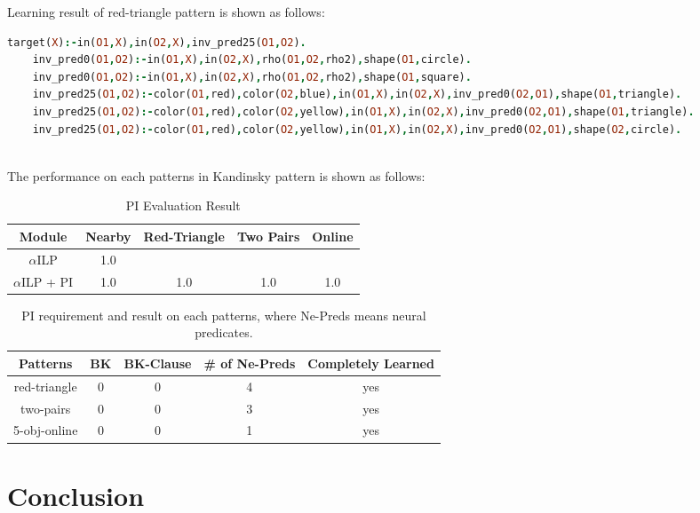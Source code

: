 \documentclass[
]{ceurart}
\begin{document}
Learning result of red-triangle pattern is shown as follows:

\begin{lstlisting}[language=Prolog, mathescape]
	target(X):-in(O1,X),in(O2,X),inv_pred25(O1,O2).
	inv_pred0(O1,O2):-in(O1,X),in(O2,X),rho(O1,O2,rho2),shape(O1,circle).
	inv_pred0(O1,O2):-in(O1,X),in(O2,X),rho(O1,O2,rho2),shape(O1,square).
	inv_pred25(O1,O2):-color(O1,red),color(O2,blue),in(O1,X),in(O2,X),inv_pred0(O2,O1),shape(O1,triangle).
	inv_pred25(O1,O2):-color(O1,red),color(O2,yellow),in(O1,X),in(O2,X),inv_pred0(O2,O1),shape(O1,triangle).
	inv_pred25(O1,O2):-color(O1,red),color(O2,yellow),in(O1,X),in(O2,X),inv_pred0(O2,O1),shape(O2,circle).
\end{lstlisting}\\



The performance on each patterns in Kandinsky pattern is shown as follows:
\begin{table}
	\caption{PI Evaluation Result}
	\label{tab:nearby-pi-result}
	\begin{tabular}{ccccc}
		\toprule
		Module              & Nearby & Red-Triangle & Two Pairs & Online\\
		\midrule
		$\alpha$ILP 	    & 1.0 	    & 		    & 		    &           \\
		$\alpha$ILP + PI    & 	1.0 	& 1.0	& 1.0	    &  1.0    \\
		\bottomrule
	\end{tabular}
\end{table}



\begin{table}
	\caption{PI requirement and result on each patterns, where Ne-Preds means neural predicates.}
	\label{tab:pi-result}
	\begin{tabular}{ccccc}
		\toprule
		Patterns             & BK & BK-Clause & \# of Ne-Preds & Completely Learned\\
		\midrule
		red-triangle 	    & 0 	    & 	0	    &  4   &   yes        \\
		two-pairs    & 	0 	& 0	& 3	    &  yes    \\
		5-obj-online    & 	0 	& 0	&  	 1   &   yes   \\
		\bottomrule
	\end{tabular}
\end{table}



\section{Conclusion}
\end{document}
